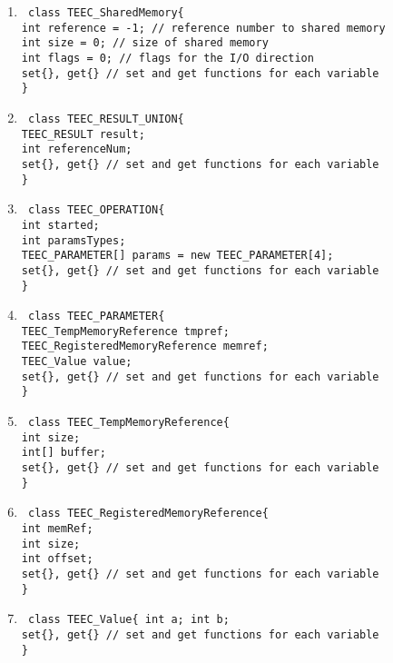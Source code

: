 \documentclass{cseminar}
\begin{document}
\begin{enumerate}
	\item \texttt{
		class TEEC\_SharedMemory\{
		\\ int reference = -1; // reference number to shared memory
		\\ int size = 0; // size of shared memory
		\\ int flags = 0; // flags for the I/O direction
		\\ set\{\}, get\{\} // set and get functions for each variable
		\\\}
	}
	\item \texttt{
		class TEEC\_RESULT\_UNION\{
			\\ TEEC\_RESULT result;
			\\ int referenceNum;
			\\ set\{\}, get\{\} // set and get functions for each variable
		\\\}
	}
	\item \texttt{
		class TEEC\_OPERATION\{
			\\ int started;
			\\ int paramsTypes;
			\\ TEEC\_PARAMETER[] params = new TEEC\_PARAMETER[4];
			\\ set\{\}, get\{\} // set and get functions for each variable		
		\\\}	
	}
	\item \texttt{
		class TEEC\_PARAMETER\{
			\\ TEEC\_TempMemoryReference tmpref;
			\\ TEEC\_RegisteredMemoryReference memref;
			\\ TEEC\_Value value;
			\\ set\{\}, get\{\} // set and get functions for each variable
		\\\}	
	}
	\item \texttt{
		class TEEC\_TempMemoryReference\{
			\\ int size;
			\\ int[] buffer;
			\\ set\{\}, get\{\} // set and get functions for each variable		
		\\\}	
	}
	\item \texttt{
		class TEEC\_RegisteredMemoryReference\{
			\\ int memRef;
			\\ int size;
			\\ int offset;		
			\\ set\{\}, get\{\} // set and get functions for each variable
		\\\}	
	}
	\item \texttt{
		class TEEC\_Value\{
			int a;
			int b;	
			\\ set\{\}, get\{\} // set and get functions for each variable		
		\\\}	
	}
\end{enumerate}
\end{document}
